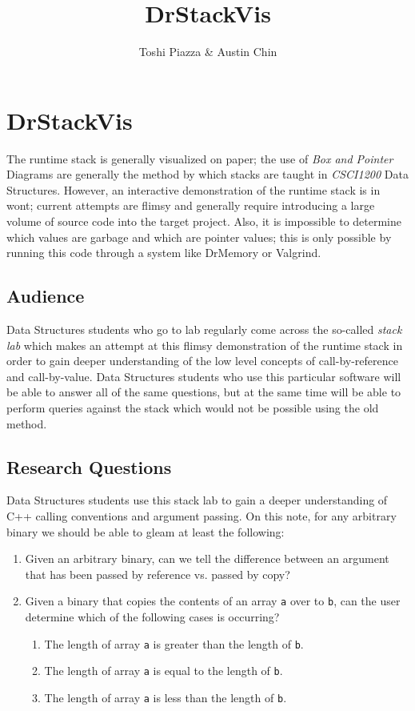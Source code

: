 \documentclass[12pt]{article}
\title{DrStackVis}
\author{Toshi Piazza \& Austin Chin}
\newcommand{\code}[1]{\texttt{#1}}
\begin{document}
\maketitle
\section{DrStackVis}
The runtime stack is generally visualized on paper; the use of \textit{Box and Pointer}
Diagrams are generally the method by which stacks are taught in \textit{CSCI1200} Data
Structures. However, an interactive demonstration of the runtime stack is in wont; current
attempts are flimsy and generally require introducing a large volume of source code into
the target project. Also, it is impossible to determine which values are garbage and which
are pointer values; this is only possible by running this code through a system like
DrMemory or Valgrind.

\subsection{Audience}
Data Structures students who go to lab regularly come across the so-called \textit{stack lab}
which makes an attempt at this flimsy demonstration of the runtime stack in order to
gain deeper understanding of the low level concepts of call-by-reference and call-by-value.
Data Structures students who use this particular software will be able to answer all of
the same questions, but at the same time will be able to perform queries against the
stack which would not be possible using the old method.

\subsection{Research Questions}
Data Structures students use this stack lab to gain a deeper understanding of C++ calling
conventions and argument passing. On this note, for any arbitrary binary we should be able
to gleam at least the following:

\begin{enumerate}
  \item Given an arbitrary binary, can we tell the difference between an argument that
    has been passed by reference vs. passed by copy?
  \item Given a binary that copies the contents of an array \code{a} over to \code{b},
    can the user determine which of the following cases is occurring?
    \begin{enumerate}
      \item The length of array \code{a} is greater than the length of \code{b}.
      \item The length of array \code{a} is equal to the length of \code{b}.
      \item The length of array \code{a} is less than the length of \code{b}.
    \end{enumerate}
\end{enumerate}
\end{document}
